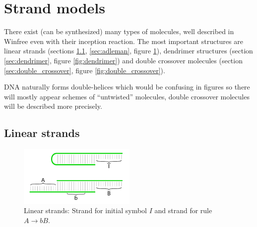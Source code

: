 
\section{Strand models}
	
	There exist (can be synthesized) many types of molecules, well described in Winfree \cite{winfree_phd} even with their inception reaction. The most important structures are linear strands (sections \ref{sec:lin_strands}, \ref{sec:adleman}, figure \ref{fig:linear}), dendrimer structures (section \ref{sec:dendrimer}, figure \ref{fig:dendrimer}) and double crossover molecules (section \ref{sec:double_crossover}, figure \ref{fig:double_crossover}).
	\begin{note}\label{note:untwist}
		DNA naturally forms double-helices which would be confusing in figures so there will mostly appear schemes of ``untwisted'' molecules, double crossover molecules will be described more precisely. %
	\end{note}
	
	
	
	
	\subsection{Linear strands}
	\label{sec:lin_strands}
		
		\begin{figure}[H]
		\begin{center}
			\includegraphics[width=0.502\textwidth]{./figures/strand_types/linear.pdf} %
			\caption{Linear strands: Strand for initial symbol $I$ and strand for rule $A\rightarrow bB$.}
			\label{fig:linear}
		\end{center}
		\end{figure}
		
